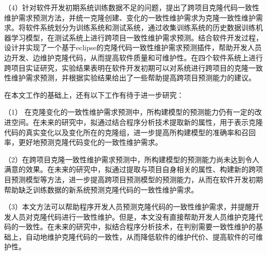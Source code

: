 （4）针对软件开发初期系统训练数据不足的问题，提出了跨项目克隆代码一致性维护需求预测方法，并统一克隆创建、变化的一致性维护需求为克隆一致性维护需求。将软件系统划分为训练系统和测试系统，通过收集训练系统的历史数据训练机器学习模型，在测试系统上进行跨项目一致性维护需求预测。结合软件开发过程，设计并实现了一个基于eclipse的克隆代码一致性维护需求预测插件，帮助开发人员边开发、边维护克隆代码，从而提高软件质量和可维护性。在四个软件系统上进行跨项目实证研究，实验结果表明在软件开发初期可以对系统进行跨项目的克隆一致性维护需求预测，并根据实验结果给出了一些帮助提高跨项目预测能力的建议。

在本文工作的基础上，还有以下工作有待于进一步研究：

（1） 在克隆变化的一致性维护需求预测中，所构建模型的预测能力仍有一定的改进空间。在未来的研究中，拟通过结合程序分析技术提取新的属性，用于表示克隆代码的真实变化以及变化所在的克隆组，进一步提高所构建模型的准确率和召回率，更好地预测克隆代码变化的一致性维护需求。

（2）在跨项目克隆一致性维护需求预测中，所构建模型的预测能力尚未达到令人满意的效果。在未来的研究中，拟通过提取与项目自身相关的属性、构建新的跨项目预测模型等方法，进一步提高跨项目预测模型的预测能力，从而在软件开发初期帮助缺乏训练数据的新系统预测克隆代码的一致性维护需求。

（3）本文方法可以帮助程序开发人员预测克隆代码的一致性维护需求，并提醒开发人员对克隆代码进行一致性维护。但是，本文没有直接帮助开发人员维护克隆代码的一致性。在未来的研究中，拟结合程序分析技术，在判别需要一致性维护的基础上，自动地维护克隆代码的一致性，从而降低软件的维护代价、提高软件的可维护性。